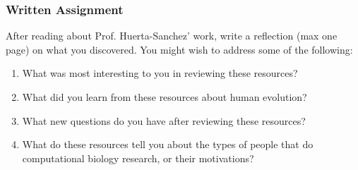 \documentclass{article}
\begin{document}
\subsubsection*{Written Assignment} 
After reading about Prof. Huerta-Sanchez' work, write a reflection (max one page) on what you discovered. You might wish to address some of the following: 

\begin{enumerate}
\item What was most interesting to you in reviewing these resources?
\item What did you learn from these resources about human evolution?
\item What new questions do you have after reviewing these resources?
\item What do these resources tell you about the types of people that do computational biology research, or their motivations?
\end{enumerate}

\EndAccSupp{}
\end{document}
